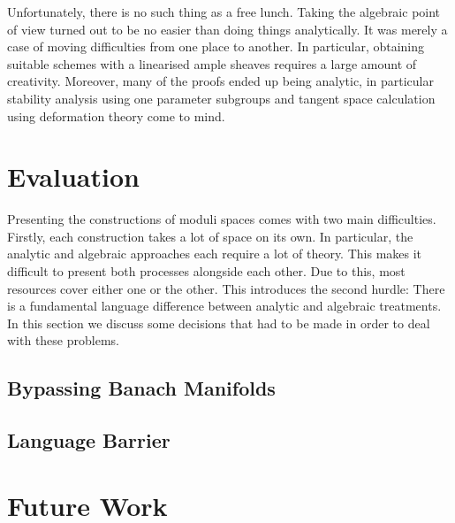 \documentclass[12pt]{ociamthesis}  %
\begin{document}
Unfortunately, there is no such thing as a free lunch. \cite{friedman1977}
Taking the algebraic point of view turned out to be no easier than
doing things analytically. It was merely a case of moving difficulties
from one place to another. In particular, obtaining suitable schemes with
a linearised ample sheaves requires a large amount of creativity.
Moreover, many of the proofs ended up being analytic, in particular
stability analysis using one parameter subgroups
and tangent space calculation using deformation theory come to mind.

\section{Evaluation}

Presenting the constructions of moduli spaces comes with two main
difficulties. Firstly, each construction takes a lot of space on its
own. In particular, the analytic and algebraic approaches each
require a lot of theory. This makes it difficult to present both
processes alongside each other. Due to this, most resources cover
either one or the other. This introduces the second hurdle: There is a
fundamental language difference between analytic and algebraic treatments.
In this section we discuss some decisions that had to be made in
order to deal with these problems.

\subsection{Bypassing Banach Manifolds}

\missingsection

\subsection{Language Barrier}

\missingsection

\section{Future Work}

\missingsection

\pagebreak
\renewcommand{\bibname}{References}
\printbibliography
\end{document}
